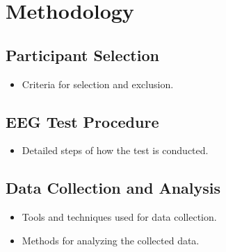 \chapter{\rm\bfseries Methodology}
\label{ch:conclusions}

\section{Participant Selection}
\begin{itemize}
    \item Criteria for selection and exclusion.
\end{itemize}

\section{EEG Test Procedure}
\begin{itemize}
    \item Detailed steps of how the test is conducted.
\end{itemize}

\section{Data Collection and Analysis}
\begin{itemize}
    \item Tools and techniques used for data collection.
    \item Methods for analyzing the collected data.
\end{itemize}



